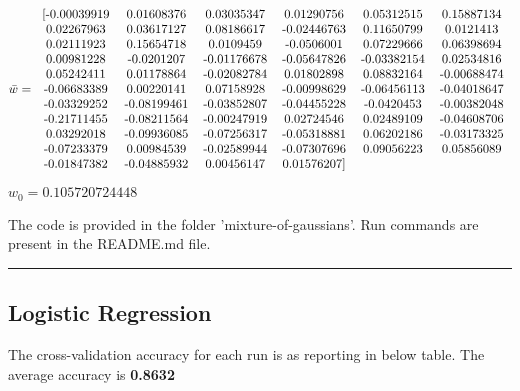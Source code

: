 \documentclass[a4paper]{article}
\begin{document}
$\bar{w} =
	\begin{tabular}{  c c c c c c  } 
		[-0.00039919 &  0.01608376 &  0.03035347 &  0.01290756 &  0.05312515 &  0.15887134 \\
		  0.02267963 &  0.03617127 &  0.08186617 & -0.02446763 &  0.11650799 &  0.0121413 \\
		  0.02111923 &  0.15654718 &  0.0109459  & -0.0506001  &  0.07229666 &  0.06398694 \\
		  0.00981228 & -0.0201207  & -0.01176678 & -0.05647826 & -0.03382154 &  0.02534816 \\
		  0.05242411 &  0.01178864 & -0.02082784 &  0.01802898 &  0.08832164 & -0.00688474 \\
		 -0.06683389 &  0.00220141 &  0.07158928 & -0.00998629 & -0.06456113 & -0.04018647 \\
		 -0.03329252 & -0.08199461 & -0.03852807 & -0.04455228 & -0.0420453  & -0.00382048 \\
		 -0.21711455 & -0.08211564 & -0.00247919 &  0.02724546 &  0.02489109 & -0.04608706 \\
		  0.03292018 & -0.09936085 & -0.07256317 & -0.05318881 &  0.06202186 & -0.03173325 \\
		 -0.07233379 &  0.00984539 & -0.02589944 & -0.07307696 &  0.09056223 &  0.05856089 \\
		 -0.01847382 & -0.04885932 &  0.00456147 &  0.01576207] & & \\
	\end{tabular}$

\vspace{5mm}
$w_0 = 0.105720724448$

The code is provided in the folder 'mixture-of-gaussians'. Run commands are present in the README.md file.

\begin{center}
	\noindent\rule{4cm}{0.4pt}
\end{center}

\subsection{Logistic Regression} \label{logistic_regression_section}
The cross-validation accuracy for each run is as reporting in below table. The average accuracy is \textbf{0.8632}
\end{document}
